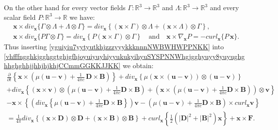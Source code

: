\documentclass{article}
\theoremstyle{definition}
\theoremstyle{remark}
\renewcommand{\vec}[1]{\mathbf{#1}}
\newcommand{\R}{\mathbb{R}}
\newcommand{\er}{\eqref}
\newcommand{\R}{{\mathbb{R}}}
\newcommand{\er}{\eqref}
\begin{document}
On the other hand for every vector fields $\Gamma:\R^3\to\R^3$ and
$\Lambda:\R^3\to\R^3$ and every scalar field $P:\R^3\to\R$ we have:
\begin{multline}\label{yguiyiu7yytyutkhjzzzyyykkknnnNWBWHWPPNKK}
\vec x\times div_{\vec
x}\{\Gamma\otimes\Lambda+\Lambda\otimes\Gamma\}=div_{\vec
x}\left\{(\vec x\times\Gamma)\otimes\Lambda+(\vec
x\times\Lambda)\otimes\Gamma\right\},\\
\vec x\times div_{\vec x}\{P\Gamma\otimes\Gamma\}=div_{\vec
x}\left\{P(\vec
x\times\Gamma)\otimes\Gamma\right\}\quad\text{and}\quad\vec
x\times\nabla_{\vec x}P=-curl_{\vec x}\{P\,\vec x\}.
\end{multline}
Thus inserting \er{yguiyiu7yytyutkhjzzzyyykkknnnNWBWHWPPNKK} into
\er{vhfffngghkjgghggtghjgfhjoyuiyuyhiyyukukyihyuSYSPNNWhgjgghyuyy8yuyughghhghghhjjhhjhjkhjCCmmGGKKJJKK}
we obtain:
\begin{multline}\label{hvkgkjgkjbjkjjkgjglhhkhjyuyghjhhjhjfghfdhgdhdfdhzzzyyyjffjjkkhhkgjgkjhfhjhgfffjgjhgjffgjggjgjggjhgkkkggjgjgmomnnnNWKK}
\frac{\partial}{\partial t}\left\{\vec x\times\left(\mu(\vec u-\vec
v)+\frac{1}{4\pi c}\,\vec D\times \vec B\right)\right\}+div_\vec
x\left\{\mu\left(\vec x\times(\vec u-\vec v)\right)\otimes(\vec
u-\vec v)\right\}\\+div_{\vec x}\left\{\left(\vec x \times\vec
v\right)\otimes\left(\mu(\vec u-\vec v)+\frac{1}{4\pi c}\vec D\times
\vec B\right)+\left(\vec x\times\left(\mu(\vec u-\vec
v)+\frac{1}{4\pi c}\vec D\times \vec B\right)\right)\otimes \vec
v\right\}\\-\vec x\times\left\{\left(div_{\vec x}\left\{\mu(\vec
u-\vec v)+\frac{1}{4\pi c}\vec D\times \vec B\right\}\right)\vec
v-\left(\mu(\vec u-\vec v)+\frac{1}{4\pi c}\vec
D\times \vec B\right)\times curl_{\vec x}\vec v\right\}\\
=\frac{1}{4\pi}div_\vec x\left\{(\vec x\times \vec D)\otimes \vec
D+(\vec x\times\vec B)\otimes \vec B\right\}+curl_{\vec
x}\left\{\frac{1}{2}\left(|\vec D|^2+|\vec B|^2\right)\vec
x\right\}+\vec x\times\vec F.
\end{multline}
\end{document}
